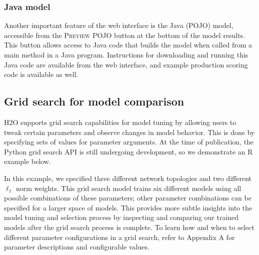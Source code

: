 \waterExampleInR


\waterExampleInPython




\subsubsection{Java model} 

Another important feature of the web interface is the Java (POJO) model, accessible from the \textsc{Preview POJO} button at the bottom of the model results. This button allows access to Java code that builds the model when called from a main method in a Java program. Instructions for downloading and running this Java code are available from the web interface, and example production scoring code is available as well.

\subsection{Grid search for model comparison} 

H2O supports grid search capabilities for model tuning by allowing users to tweak certain parameters and observe changes in model behavior. This is done by specifying sets of values for parameter arguments. At the time of publication, the Python grid search API is still undergoing development, so we demonstrate an R example below.   

\waterExampleInR


%


\normalsize
\noindent
In this example, we specified three different network topologies and two different $\ell_1$ norm weights. This grid search model trains six different models using all possible combinations of these parameters; other parameter combinations can be specified for a larger space of models. This provides more subtle insights into the model tuning and selection process by inspecting and comparing our trained models after the grid search process is complete. To learn how and when to select different parameter configurations in a grid search, refer to Appendix A for parameter descriptions and configurable values. 

\waterExampleInR


